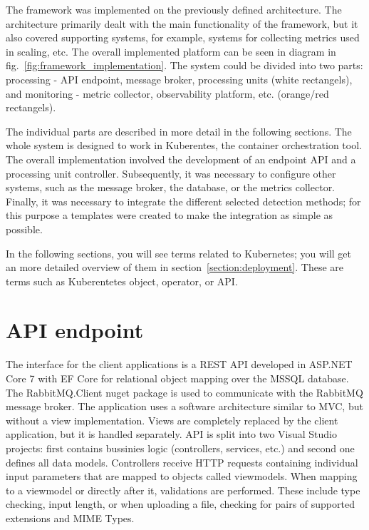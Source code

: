 The framework was implemented on the previously defined architecture. The architecture primarily dealt with the main functionality of the framework, but it also covered supporting systems, for example, systems for collecting metrics used in scaling, etc. The overall implemented platform can be seen in diagram in fig.~\ref{fig:framework_implementation}. The system could be divided into two parts: processing - API endpoint, message broker, processing units (white rectangels), and monitoring - metric collector, observability platform, etc. (orange/red rectangels).

The individual parts are described in more detail in the following sections. The whole system is designed to work in Kuberentes, the container orchestration tool. The overall implementation involved the development of an endpoint API and a processing unit controller. Subsequently, it was necessary to configure other systems, such as the message broker, the database, or the metrics collector. Finally, it was necessary to integrate the different selected detection methods; for this purpose a templates were created to make the integration as simple as possible.

In the following sections, you will see terms related to Kubernetes; you will get an more detailed overview of them in section~\ref{section:deployment}. These are terms such as Kuberentetes object, operator, or API.

\section{API endpoint}

The interface for the client applications is a REST API developed in ASP.NET Core 7 with EF Core for relational object mapping over the MSSQL database. The RabbitMQ.Client nuget package is used to communicate with the RabbitMQ message broker. The application uses a software architecture similar to MVC, but without a view implementation. Views are completely replaced by the client application, but it is handled separately. API is split into two Visual Studio projects: first contains bussinies logic (controllers, services, etc.) and second one defines all data models. Controllers receive HTTP requests containing individual input parameters that are mapped to objects called viewmodels. When mapping to a viewmodel or directly after it, validations are performed. These include type checking, input length, or when uploading a file, checking for pairs of supported extensions and MIME Types.

